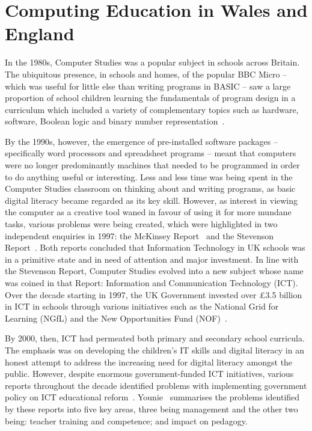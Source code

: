 \documentclass{sig-alternate}
\begin{document}
\section{Computing Education in Wales and England}

In the 1980s, Computer Studies was a popular subject
in schools across Britain. The ubiquitous presence, in schools and homes,
of the popular BBC Micro -- which was useful for little else than
writing programs in BASIC -- saw a large proportion
of school children learning the fundamentals of program design
in a curriculum which included a variety of complementary
topics such as hardware, software, Boolean logic
and binary number representation~\cite{Doyle:1988}.

By the 1990s, however, the emergence of pre-installed software
packages -- specifically word processors and spreadsheet programs --
meant that computers were no longer predominantly machines that needed
to be programmed in order to do anything useful or interesting.  Less
and less time was being spent in the Computer Studies classroom on
thinking about and writing programs, as basic digital literacy became
regarded as its key skill.  However, as interest in viewing the
computer as a creative tool waned in favour of using it for more
mundane tasks, various problems were being created, which were
highlighted in two independent enquiries in 1997: the McKinsey
Report~\cite{McKinsey:1997} and the Stevenson
Report~\cite{Stevenson:1997}.  Both reports concluded that Information
Technology in UK schools was in a primitive state and in need of
attention and major investment.  In line with the Stevenson
Report, Computer Studies evolved into a new
subject whose name was coined in that Report: Information and
Communication Technology (ICT).  Over the decade starting in 1997, the
UK Government invested over \pounds3.5 billion in ICT in schools
through various initiatives such as the National Grid for Learning
(NGfL) and the New Opportunities Fund (NOF)~\cite{Doughty:2006}.

By 2000, then, ICT had permeated both primary and secondary school
curricula.  The emphasis was on developing the children's IT skills
and digital literacy in an honest attempt to address the increasing
need for digital literacy amongst the public.  However, despite
enormous government-funded ICT initiatives, various reports throughout
the decade identified problems with implementing government policy on
ICT educational
reform~\cite{OpieFukuyo:2000,Ofsted:2001,Ofsted:2002,Ofsted:2004,
Loveless:2005}.  Younie~\cite{Younie:2006} summarises the problems
identified by these reports into five key areas, three being
management and the other two being: teacher training and competence;
and impact on pedagogy.
\end{document}
